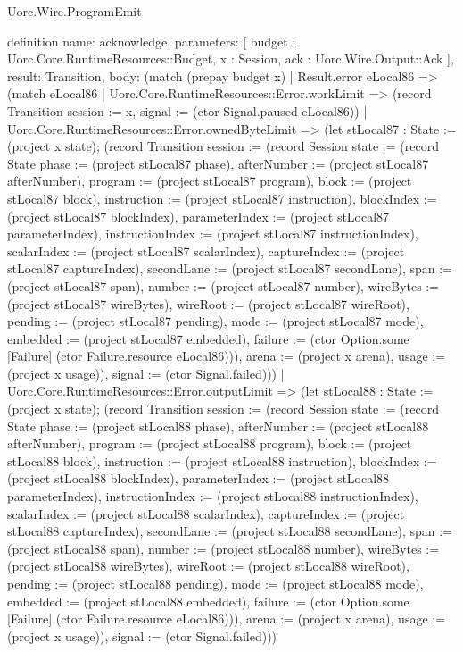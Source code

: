 \begin{lexlean}{Uorc.Wire.ProgramEmit}
\begin{semanticmodule}
definition{
  name: acknowledge,
  parameters: [
    budget : Uorc.Core.RuntimeResources::Budget,
    x : Session,
    ack : Uorc.Wire.Output::Ack
  ],
  result: Transition,
  body: (match (prepay budget x)
    | Result.error eLocal86 => (match eLocal86
      | Uorc.Core.RuntimeResources::Error.workLimit => (record Transition {session := x, signal := (ctor Signal.paused eLocal86)})
      | Uorc.Core.RuntimeResources::Error.ownedByteLimit => (let stLocal87 : State := (project x state); (record Transition {session := (record Session {state := (record State {phase := (project stLocal87 phase), afterNumber := (project stLocal87 afterNumber), program := (project stLocal87 program), block := (project stLocal87 block), instruction := (project stLocal87 instruction), blockIndex := (project stLocal87 blockIndex), parameterIndex := (project stLocal87 parameterIndex), instructionIndex := (project stLocal87 instructionIndex), scalarIndex := (project stLocal87 scalarIndex), captureIndex := (project stLocal87 captureIndex), secondLane := (project stLocal87 secondLane), span := (project stLocal87 span), number := (project stLocal87 number), wireBytes := (project stLocal87 wireBytes), wireRoot := (project stLocal87 wireRoot), pending := (project stLocal87 pending), mode := (project stLocal87 mode), embedded := (project stLocal87 embedded), failure := (ctor Option.some [Failure] (ctor Failure.resource eLocal86))}), arena := (project x arena), usage := (project x usage)}), signal := (ctor Signal.failed)}))
      | Uorc.Core.RuntimeResources::Error.outputLimit => (let stLocal88 : State := (project x state); (record Transition {session := (record Session {state := (record State {phase := (project stLocal88 phase), afterNumber := (project stLocal88 afterNumber), program := (project stLocal88 program), block := (project stLocal88 block), instruction := (project stLocal88 instruction), blockIndex := (project stLocal88 blockIndex), parameterIndex := (project stLocal88 parameterIndex), instructionIndex := (project stLocal88 instructionIndex), scalarIndex := (project stLocal88 scalarIndex), captureIndex := (project stLocal88 captureIndex), secondLane := (project stLocal88 secondLane), span := (project stLocal88 span), number := (project stLocal88 number), wireBytes := (project stLocal88 wireBytes), wireRoot := (project stLocal88 wireRoot), pending := (project stLocal88 pending), mode := (project stLocal88 mode), embedded := (project stLocal88 embedded), failure := (ctor Option.some [Failure] (ctor Failure.resource eLocal86))}), arena := (project x arena), usage := (project x usage)}), signal := (ctor Signal.failed)}))
}
\end{semanticmodule}
\end{lexlean}
